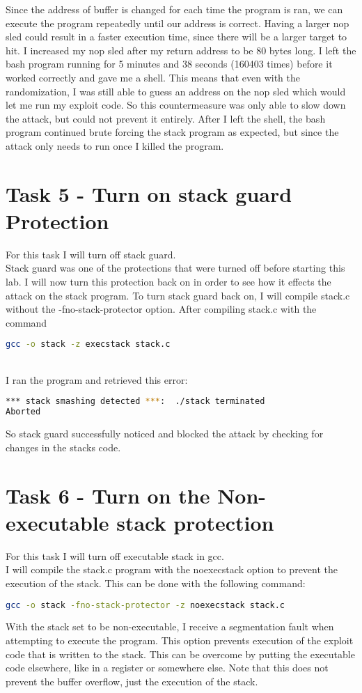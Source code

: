 \documentclass[14pt]{extarticle}
\begin{document}
Since the address of buffer is changed for each time the program is ran, we can execute the program repeatedly until our address is correct. Having a larger nop sled could result in a faster execution time, since there will be a larger target to hit.
I increased my nop sled after my return address to be 80 bytes long. I left the bash program running for 5 minutes and 38 seconds (160403 times) before it worked correctly and gave me a shell. This means that even with the randomization, I was still able to guess an address on the nop sled which would let me run my exploit code. So this countermeasure was only able to slow down the attack, but could not prevent it entirely. After I left the shell, the bash program continued brute forcing the stack program as expected, but since the attack only needs to run once I killed the program.

\section{Task 5 - Turn on stack guard Protection}
For this task I will turn off stack guard.\\
Stack guard was one of the protections that were turned off before starting this lab. I will now turn this protection back on in order to see how it effects the attack on the stack program.
To turn stack guard back on, I will compile stack.c without the -fno-stack-protector option.
After compiling stack.c with the command
\begin{lstlisting}[language=sh]
gcc -o stack -z execstack stack.c
\end{lstlisting}\cite{seed-bof}\\
I ran the program and retrieved this error:
\begin{lstlisting}[language=sh]
*** stack smashing detected ***:  ./stack terminated
Aborted
\end{lstlisting}
So stack guard successfully noticed and blocked the attack by checking for changes in the stacks code.
\section{Task 6 - Turn on the Non-executable stack protection}
For this task I will turn off executable stack in gcc.\\
I will compile the stack.c program with the noexecstack option to prevent the execution of the stack. This can be done with the following command:
\begin{lstlisting}[language=sh]
gcc -o stack -fno-stack-protector -z noexecstack stack.c
\end{lstlisting}
With the stack set to be non-executable, I receive a segmentation fault when attempting to execute the program. This option prevents execution of the exploit code that is written to the stack. This can be overcome by putting the executable code elsewhere, like in a register or somewhere else. Note that this does not prevent the buffer overflow, just the execution of the stack\cite{seed-bof}.
\end{document}
